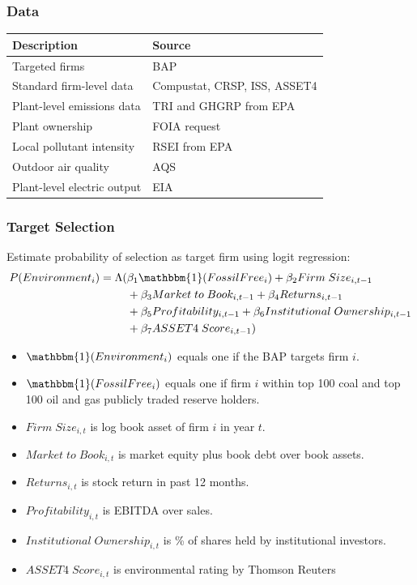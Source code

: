 \documentclass{beamer}
\newcommand{\one}{\mathbbm{1}}
\begin{document}
\begin{frame}
\frametitle{Data}

\begin{center}
\begin{tabular}{ l | l}
\textbf{Description} & \textbf{Source}\\ 
\hline
Targeted firms  & BAP  \\  
\hline
Standard firm-level data & Compustat, CRSP, ISS, ASSET4  \\
\hline
Plant-level emissions data & TRI and GHGRP from EPA \\
\hline
Plant ownership & FOIA request\\
\hline 
Local pollutant intensity & RSEI from EPA \\
\hline
Outdoor air quality  & AQS \\
\hline
Plant-level electric output  & EIA
\end{tabular}
\end{center}
\end{frame}


\begin{frame}
\frametitle{Target Selection}
Estimate probability of selection as target firm using logit regression:
\begin{align*}
P(Environment_i) = \Lambda(& \beta_1 \one(Fossil Free_{i}) + \beta_2 Firm \; Size_{i,t-1} \\&+ \beta_3 Market \; to \; Book_{i,t-1} + \beta_4 Returns_{i,t-1} \\&+ \beta_5 Profitability_{i,t-1} + \beta_6 Institutional \; Ownership_{i,t-1} \\&+ \beta_7 ASSET4 \; Score_{i,t-1})
\end{align*}

\begin{itemize}[<+->]
\item $\one(Environment_i)$ equals one if the BAP targets firm $i$.
\item $\one(Fossil Free_{i})$ equals one if firm $i$ within top 100 coal and top 100 oil and gas publicly traded reserve holders.
\item $Firm \; Size_{i,t}$ is log book asset of firm $i$ in year $t$.
\item $Market \; to \; Book_{i,t}$ is market equity plus book debt over book assets.
\item $Returns_{i,t}$ is stock return in past 12 months.
\item $Profitability_{i,t}$ is EBITDA over sales.
\item $Institutional \; Ownership_{i,t}$ is \% of shares held by institutional investors.
\item $ASSET4 \; Score_{i,t}$ is environmental rating by Thomson Reuters
\end{itemize}

\end{frame}
\end{document}
